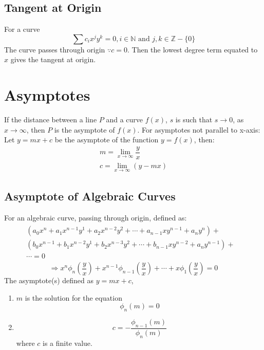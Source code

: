 \documentclass[openany, oneside]{book}
\begin{document}
\subsection{Tangent at Origin}
For a curve
\begin{equation}
\sum c_i x^j y^k=0, i\in\mathbb{N}\text{ and }j,k\in\mathbb{Z}-\lbrace 0 \rbrace
\end{equation}
The curve passes through origin $\because c=0$. Then the lowest degree term equated to $x$ gives the tangent at origin.

\section{Asymptotes}
If the distance between a line $P$ and a curve $f(x)$, $s$ is such that $s\to0$, as $x\to\infty$, then $P$ is the asymptote of $f(x)$. For asymptotes not parallel to x-axis:\newline
Let $y=mx+c$ be the asymptote of the function $y=f(x)$, then:
\begin{align}
m=\lim_{x\to\infty} \dfrac{y}{x}\\
c=\lim_{x\to\infty} (y-mx)
\end{align}

\subsection{Asymptote of Algebraic Curves}
For an algebraic curve, passing through origin, defined as:
\begin{equation}
\begin{aligned}
\begin{split}
(a_0x^n+a_1x^{n-1}y^1+a_2x^{n-2}y^2+\cdots+a_{n-1}xy^{n-1}+a_n y^n)+&\\
(b_0x^{n-1}+b_1x^{n-2}y^1+b_2x^{n-3}y^2+\cdots+b_{n-1}xy^{n-2}+a_n y^{n-1})+&\\
\cdots=0\nonumber
\end{split}
\end{aligned}
\end{equation}
\begin{equation}
\Rightarrow x^n\phi_n\left(\dfrac{y}{x}\right)+x^{n-1}\phi_{n-1}\left(\dfrac{y}{x}\right)+\cdots+x\phi_1\left(\dfrac{y}{x}\right)=0\nonumber
\end{equation}
The asymptote(s) defined as $y=mx+c$,
\begin{enumerate}
\item $m$ is the solution for the equation 
\begin{equation}
\phi_n(m)=0
\end{equation}
\item \begin{equation}
c=-\dfrac{\phi_{n-1}(m)}{\phi_n (m)}
\end{equation}
where $c$ is a finite value.
\end{enumerate}
\end{document}
